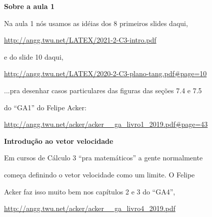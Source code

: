 \documentclass[oneside,12pt]{article}
\begin{document}
{\bf Sobre a aula 1}

Na aula 1 nós usamos as idéias dos 8 primeiros slides daqui,

\ssk

{\footnotesize

\url{http://angg.twu.net/LATEX/2021-2-C3-intro.pdf}

}

\ssk

e do slide 10 daqui,

\ssk

{\footnotesize

\url{http://angg.twu.net/LATEX/2020-2-C3-plano-tang.pdf#page=10}

}

\ssk

...pra desenhar casos particulares das figuras das seções 7.4 e 7.5

do ``GA1'' do Felipe Acker:

\ssk

{\footnotesize

\url{http://angg.twu.net/acker/acker__ga_livro1_2019.pdf\#page=43}

}


\newpage


{\bf Introdução ao vetor velocidade}

Em cursos de Cálculo 3 ``pra matemáticos'' a gente normalmente

começa definindo o vetor velocidade como um limite. O Felipe

Acker faz isso muito bem nos capítulos 2 e 3 do ``GA4'',

\ssk

{\footnotesize

\url{http://angg.twu.net/acker/acker__ga_livro4_2019.pdf}

}
\end{document}
